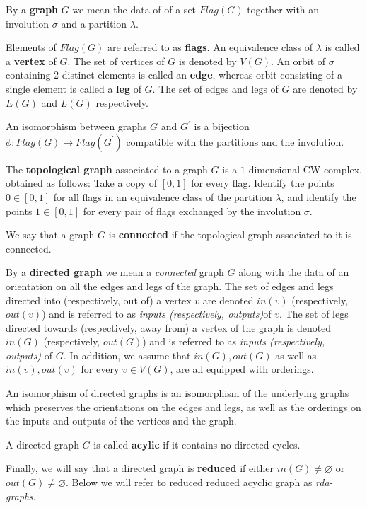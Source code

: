 \documentclass[a4paper,10pt]{amsart}
\begin{document}
By a \textbf{graph} $G$ we mean the data of of a set $Flag(G)$ together with an involution $\sigma$ and a partition $\lambda$. 

Elements of $Flag(G)$ are referred to as \textbf{flags}. An equivalence class of $\lambda$ is called a \textbf{vertex} of $G$. The set of vertices of $G$ is denoted by $V(G)$. An orbit of $\sigma$ containing $2$ distinct elements is called an \textbf{edge}, whereas orbit consisting of a single element is called a \textbf{leg} of $G$. The set of edges and legs of $G$ are denoted by $E(G)$ and $L(G)$ respectively. 

An isomorphism between graphs $G$ and $G^\prime$ is a bijection $\phi \colon Flag(G) \to Flag(G^\prime)$ compatible with the partitions and the involution.

The \textbf{topological graph} associated to a graph $G$ is a $1$ dimensional CW-complex, obtained as follows: Take a copy of $[0,1]$ for every flag. Identify the points $0 \in [0,1]$ for all flags in an equivalence class of the partition $\lambda$, and identify the points $1 \in [0,1]$ for every pair of flags exchanged by the involution $\sigma$.

We say that a graph $G$ is \textbf{connected} if the topological graph associated to it is connected.

By a \textbf{directed graph} we mean a \emph{connected} graph $G$ along with the data of an orientation on all the edges and legs of the graph. The set of edges and legs directed into (respectively, out of) a vertex $v$ are denoted $in(v)$ (respectively, $out(v)$) and is referred to as \emph{inputs (respectively, outputs)}of $v$. The set of legs directed towards (respectively, away from) a vertex of the graph is denoted $in(G)$ (respectively, $out(G)$) and is referred to as \emph{inputs (respectively, outputs)} 	of $G$. In addition, we assume that $in(G), out(G)$ as well as $in(v),out(v)$ for every $v \in V(G)$, are all equipped with orderings.

An isomorphism of directed graphs is an isomorphism of the underlying graphs which preserves the orientations on the edges and legs, as well as the orderings on the inputs and outputs of the vertices and the graph.

A directed graph $G$ is called \textbf{acylic} if it contains no directed cycles. 

Finally, we will say that a directed graph is \textbf{reduced} if either $in(G) \neq \varnothing$ or $out(G) \neq \varnothing$. Below we will refer to reduced reduced acyclic graph as \emph{rda-graphs}.
\end{document}
